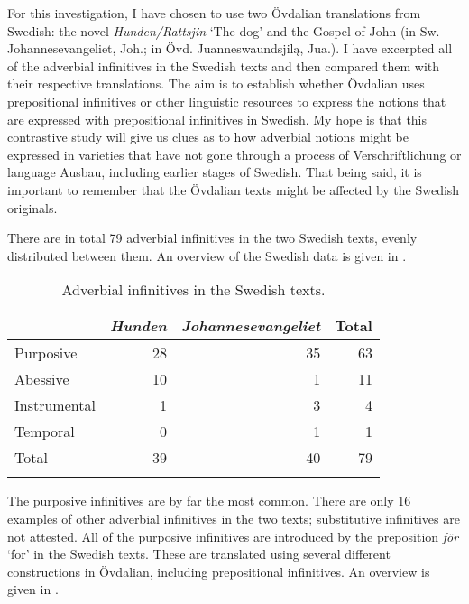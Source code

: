 \documentclass[output=paper]{langscibook}
\begin{document}
For this investigation, I have chosen to use two Övdalian translations from Swedish: the novel \textit{Hunden/Rattsjin} ‘The dog’ and the Gospel of John (in Sw. Johannesevangeliet, Joh.; in Övd. Juanneswaundsjilą, Jua.). I have excerpted all of the adverbial infinitives in the Swedish texts and then compared them with their respective translations. The aim is to establish whether Övdalian uses prepositional infinitives or other linguistic resources to express the notions that are expressed with prepositional infinitives in Swedish. My hope is that this contrastive study will give us clues as to how adverbial notions might be expressed in varieties that have not gone through a process of Verschriftlichung or language Ausbau, including earlier stages of Swedish. That being said, it is important to remember that the Övdalian texts might be affected by the Swedish originals. 

There are in total 79 adverbial infinitives in the two Swedish texts, evenly distributed between them. An overview of the Swedish data is given in . 

\begin{table}
\caption{Adverbial infinitives in the Swedish texts.\label{tab:kalm:3}}
\begin{tabular}{lrrr} 
\lsptoprule
& \textit{Hunden} & \textit{Johannesevangeliet} & Total\\\midrule
Purposive & 28 & 35 & 63\\
Abessive & 10 & 1 & 11\\
Instrumental & 1 & 3 & 4\\
Temporal & 0 & 1 & 1\\
Total & 39 & 40 & 79\\
\lspbottomrule
\end{tabular}
\end{table}


The purposive infinitives are by far the most common. There are only 16 examples of other adverbial infinitives in the two texts; substitutive infinitives are not attested. All of the purposive infinitives are introduced by the preposition \textit{för} ‘for’ in the Swedish texts. These are translated using several different constructions in Övdalian, including prepositional infinitives. An overview is given in . 
\end{document}
